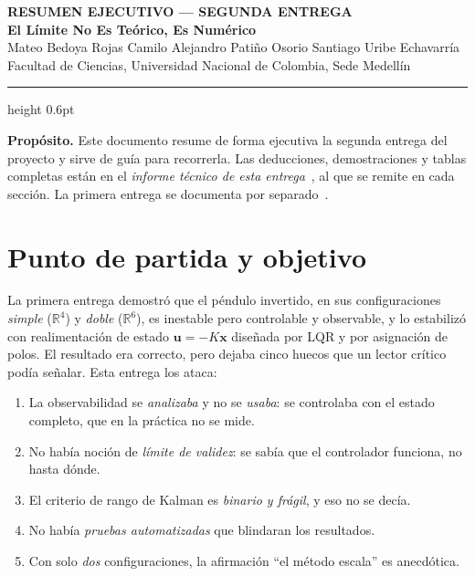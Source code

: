 \documentclass[11pt,letterpaper]{article}
\newcommand{\R}{\mathbb{R}}
\newcommand{\xv}{\bm{x}}
\newcommand{\uv}{\bm{u}}
\begin{document}
\begin{center}
    {\footnotesize\bfseries\color{acento2} RESUMEN EJECUTIVO --- SEGUNDA ENTREGA}\\[0.4em]
    {\LARGE\bfseries El Límite No Es Teórico, Es Numérico}\\[0.6em]
    {\normalsize Mateo Bedoya Rojas \quad\textbullet\quad Camilo Alejandro Patiño Osorio \quad\textbullet\quad Santiago Uribe Echavarría}\\[0.3em]
    {\footnotesize Facultad de Ciencias, Universidad Nacional de Colombia, Sede Medellín}
\end{center}
\vspace{0.2em}
\hrule height 0.6pt
\vspace{0.8em}

\noindent
\begin{clave}
\small
\textbf{Propósito.} Este documento resume de forma ejecutiva la segunda entrega
del proyecto y sirve de guía para recorrerla. Las deducciones, demostraciones y
tablas completas están en el \emph{informe técnico de esta
entrega}~\cite{tecnico2}, al que se remite en cada sección. La primera entrega
se documenta por separado~\cite{tecnico1}.
\end{clave}

\section{Punto de partida y objetivo}

La primera entrega demostró que el péndulo invertido, en sus configuraciones
\emph{simple} ($\R^4$) y \emph{doble} ($\R^6$), es inestable pero controlable y
observable, y lo estabilizó con realimentación de estado $\uv=-K\xv$ diseñada
por LQR y por asignación de polos. El resultado era correcto, pero dejaba cinco
huecos que un lector crítico podía señalar. Esta entrega los ataca:

\begin{enumerate}
  \item La observabilidad se \emph{analizaba} y no se \emph{usaba}: se controlaba
  con el estado completo, que en la práctica no se mide.
  \item No había noción de \emph{límite de validez}: se sabía que el controlador
  funciona, no hasta dónde.
  \item El criterio de rango de Kalman es \emph{binario y frágil}, y eso no se
  decía.
  \item No había \emph{pruebas automatizadas} que blindaran los resultados.
  \item Con solo \emph{dos} configuraciones, la afirmación ``el método escala''
  es anecdótica.
\end{enumerate}
\end{document}
